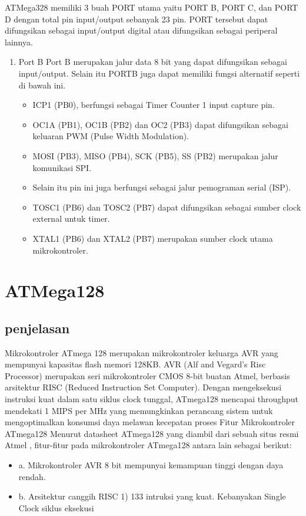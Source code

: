 	ATMega328 memiliki 3 buah PORT utama yaitu PORT B, PORT C, dan PORT D dengan total pin input/output sebanyak 23 pin. PORT tersebut dapat difungsikan sebagai input/output digital atau difungsikan sebagai periperal lainnya.
	\begin{enumerate}
	\item Port B 
		Port B merupakan jalur data 8 bit yang dapat difungsikan sebagai input/output. Selain itu PORTB juga dapat memiliki fungsi alternatif seperti di bawah ini.
		\begin{itemize}
			\item ICP1 (PB0), berfungsi sebagai Timer Counter 1 input capture pin. 
			\item OC1A (PB1), OC1B (PB2) dan OC2 (PB3) dapat difungsikan sebagai keluaran PWM (Pulse Width Modulation).
			\item MOSI (PB3), MISO (PB4), SCK (PB5), SS (PB2) merupakan jalur komunikasi SPI.
			\item Selain itu pin ini juga berfungsi sebagai jalur pemograman serial (ISP).
			\item TOSC1 (PB6) dan TOSC2 (PB7) dapat difungsikan sebagai sumber clock external untuk timer.
			\item XTAL1 (PB6) dan XTAL2 (PB7) merupakan sumber clock utama mikrokontroler.
		\end{itemize}

	\end{enumerate}
\section{ATMega128}
	\subsection{penjelasan}
	Mikrokontroler ATmega 128 merupakan mikrokontroler keluarga AVR yang mempunyai kapasitas flash memori 128KB. AVR (Alf and Vegard’s Risc Processor) merupakan seri mikrokontroler CMOS 8-bit buatan Atmel, berbasis arsitektur RISC (Reduced Instruction Set Computer). Dengan mengeksekusi instruksi kuat dalam satu siklus clock tunggal, ATmega128 mencapai throughput mendekati 1 MIPS per MHz yang memungkinkan perancang sistem untuk mengoptimalkan konsumsi daya melawan kecepatan proses
	Fitur Mikrokontroler ATmega128
	Menurut datasheet ATmega128 yang diambil dari sebuah situs resmi Atmel , fitur-fitur pada mikrokontroler ATmega128 antara lain sebagai berikut:
	\begin{itemize}
		\item a. Mikrokontroler AVR 8 bit mempunyai kemampuan tinggi dengan daya rendah. 
		\item b. Arsitektur canggih RISC
				1) 133 intruksi yang kuat. Kebanyakan Single Clock siklus eksekusi 
		\end{itemize}

	